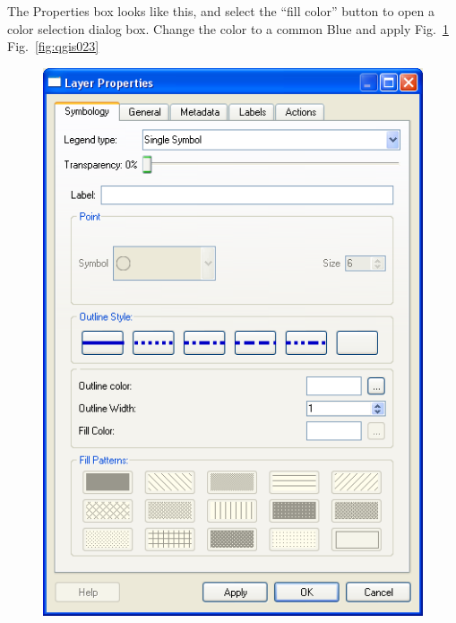 The Properties box looks like this, and select the ``fill color'' button
to open a color selection dialog box. Change the color to a common Blue
and apply Fig.~\ref{fig:qgis022} Fig.~\ref{fig:qgis023}

\begin{figure}[htbp]
   \centering
   \includegraphics[scale=0.35]{qgis022.png}
   \caption{}
   \label{fig:qgis022}
\end{figure}


